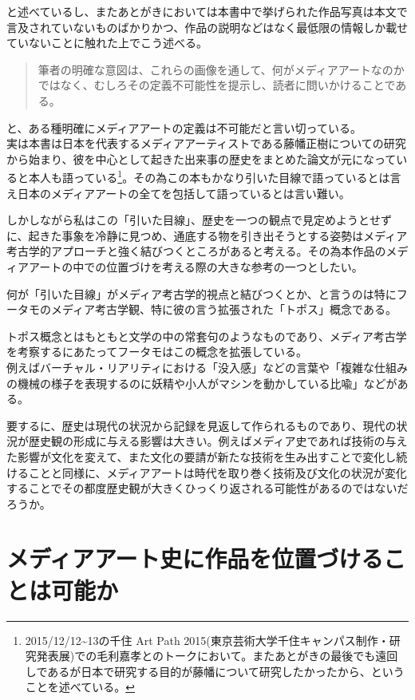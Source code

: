 と述べているし、またあとがきにおいては本書中で挙げられた作品写真は本文で言及されていないものばかりかつ、作品の説明などはなく最低限の情報しか載せていないことに触れた上でこう述べる。

\begin{quote}
筆者の明確な意図は、これらの画像を通して、何がメディアアートなのかではなく、むしろその定義不可能性を提示し、読者に問いかけることである。
\end{quote}

と、ある種明確にメディアアートの定義は不可能だと言い切っている。\\
実は本書は日本を代表するメディアアーティストである藤幡正樹についての研究から始まり、彼を中心として起きた出来事の歴史をまとめた論文が元になっていると本人も語っている\footnote{2015/12/12\textasciitilde{}13の千住
  Art Path
  2015(東京芸術大学千住キャンパス制作・研究発表展)での毛利嘉孝とのトークにおいて。またあとがきの最後でも遠回しであるが日本で研究する目的が藤幡について研究したかったから、ということを述べている。}。その為この本もかなり引いた目線で語っているとは言え日本のメディアアートの全てを包括して語っているとは言い難い。

しかしながら私はこの「引いた目線」、歴史を一つの観点で見定めようとせずに、起きた事象を冷静に見つめ、通底する物を引き出そうとする姿勢はメディア考古学的アプローチと強く結びつくところがあると考える。その為本作品のメディアアートの中での位置づけを考える際の大きな参考の一つとしたい。

何が「引いた目線」がメディア考古学的視点と結びつくとか、と言うのは特にフータモのメディア考古学観、特に彼の言う拡張された「トポス」概念である。

トポス概念とはもともと文学の中の常套句のようなものであり、メディア考古学を考察するにあたってフータモはこの概念を拡張している。\\
例えばバーチャル・リアリティにおける「没入感」などの言葉や「複雑な仕組みの機械の様子を表現するのに妖精や小人がマシンを動かしている比喩」などがある。

要するに、歴史は現代の状況から記録を見返して作られるものであり、現代の状況が歴史観の形成に与える影響は大きい。例えばメディア史であれば技術の与えた影響が文化を変えて、また文化の要請が新たな技術を生み出すことで変化し続けることと同様に、メディアアートは時代を取り巻く技術及び文化の状況が変化することでその都度歴史観が大きくひっくり返される可能性があるのではないだろうか。

\section{メディアアート史に作品を位置づけることは可能か}\label{ux30e1ux30c7ux30a3ux30a2ux30a2ux30fcux30c8ux53f2ux306bux4f5cux54c1ux3092ux4f4dux7f6eux3065ux3051ux308bux3053ux3068ux306fux53efux80fdux304b}

